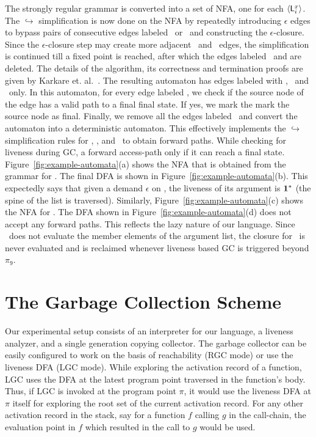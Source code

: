 \documentclass[9pt]{sigplanconf}
\begin{document}
The strongly regular grammar is converted  into a set of NFA, one for
each $\langle \mathsf{L}_{{i}}^{x}\rangle$.  The $\hookrightarrow$ simplification is now
done on the NFA by  repeatedly introducing $\epsilon$ edges to bypass
pairs  of consecutive  edges labeled  \bcar\acar\ or  \bcdr\acdr\ and
constructing the $\epsilon$-closure. Since the $\epsilon$-closure step
may  create  more  adjacent  \bcar\acar\ and  \bcdr\acdr\  edges,  the
simplification is continued till a fixed point is reached, after which
the edges labeled \bcar \ and  \bcdr are deleted.  The details of the
algorithm, its correctness and termination proofs are given by Karkare
et.  al.~\cite{karkare07liveness,asati14lgc}.  The resulting automaton
has  edges labeled  with  \acar,  \acdr\ and  \clazy\  only. In  this
automaton, for every edge labeled \clazy, we check if the source node
of the edge has a valid path to  a final final state.  If yes, we mark
the mark  the source node as  final. Finally, we remove  all the edges
labeled  \clazy\  and  convert  the automaton  into  a  deterministic
automaton.    This   effectively  implements   the   $\hookrightarrow$
simplification rules for  \bcar, \bcdr, and \clazy\  to obtain forward
paths. While  checking for liveness  during GC, a  forward access-path
only if it can reach a final state.
Figure~\ref{fig:example-automata}(a)  shows the  NFA that  is obtained
from the grammar for .  The final DFA is shown in
Figure~\ref{fig:example-automata}(b).  This expectedly says that given
a  demand $\epsilon$  on  \length,  the liveness  of  its argument  is
$\mathbf{1}^{*}$  (the  spine  of   the  list  is  traversed).   Similarly,
Figure~\ref{fig:example-automata}(c)     shows     the     NFA     for
.          The         DFA         shown         in
Figure~\ref{fig:example-automata}(d)  does  not   accept  any  forward
paths.   This  reflects  the  lazy  nature  of  our  language.   Since
\length\ does not  evaluate the member elements of  the argument list,
the  closure for  \pa\ is  never evaluated  and is  reclaimed whenever
liveness based GC is triggered beyond $\pi_9$.


\section{The Garbage Collection Scheme}
\label{sec:GC-scheme}
Our experimental setup consists of  an interpreter for our language, a
liveness  analyzer, and  a single  generation copying  collector.  The
garbage collector  can be  easily configured to  work on the  basis of
reachability (RGC  mode) or use  the liveness DFA (LGC  mode).  While
exploring the  activation record of a  function, LGC uses  the DFA at
the latest program  point traversed in the function's  body.  Thus, if
LGC is invoked  at the program point $\pi$, it  would use the liveness
DFA  at  $\pi$ itself  for  exploring the  root  set  of the  current
activation record. For  any other activation record in  the stack, say
for a function ${\mathit f}$  calling ${\mathit g}$ in the call-chain,
the evaluation  point in ${\mathit f}$  which resulted in  the call to
${\mathit g}$ would be used.
\end{document}
